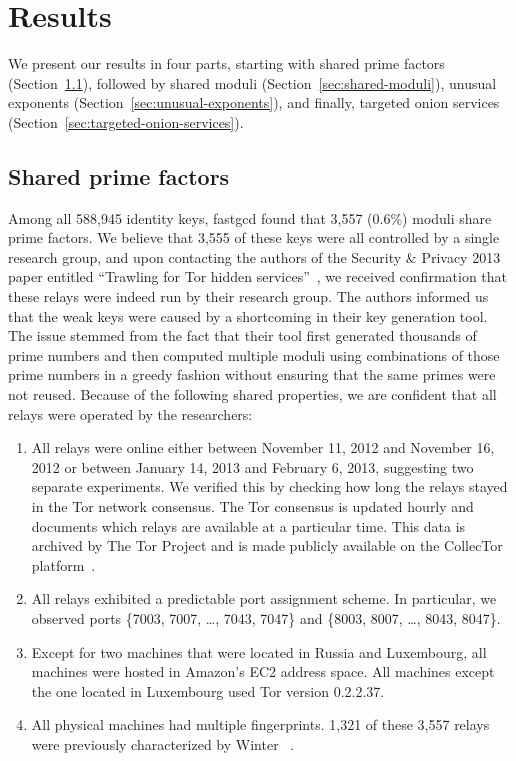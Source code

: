 \section{Results}
\label{sec:results}
We present our results in four parts, starting with shared prime factors
(Section~\ref{sec:shared-primes}), followed by shared moduli
(Section~\ref{sec:shared-moduli}), unusual exponents 
(Section~\ref{sec:unusual-exponents}), and finally, targeted onion services
(Section~\ref{sec:targeted-onion-services}).

\subsection{Shared prime factors}
\label{sec:shared-primes}
Among all 588,945 identity keys, fastgcd found that 3,557 (0.6\%)
moduli share prime factors.  We believe that 3,555 of these keys were all
controlled by a single research group, and upon contacting the authors of the
Security \& Privacy 2013 paper entitled ``Trawling for Tor hidden
services''~\cite{Biryukov2013a}, we received confirmation that these relays
were indeed run by their research group.  The authors informed us that the weak
keys were caused by a shortcoming in their key generation tool. The issue
stemmed from the fact that their tool first generated thousands of prime numbers
and then computed multiple moduli using combinations of those prime numbers in a
greedy fashion without ensuring that the same primes were not reused.  Because
of the following shared properties, we are confident that all relays were
operated by the researchers:

\begin{enumerate}
	\item All relays were online either between November 11, 2012 and
		November 16, 2012 or between January 14, 2013 and February 6, 2013,
		suggesting two separate experiments. We verified this by checking how
		long the relays stayed in the Tor network consensus. The Tor consensus
		is updated hourly and documents which relays are available at a
		particular time. This data is archived by The Tor Project and is made
		publicly available on the CollecTor platform~\cite{collector}.

	\item All relays exhibited a predictable port assignment scheme.  In
		particular, we observed ports \{7003, 7007, \dots, 7043, 7047\} and
		\{8003, 8007, \dots, 8043, 8047\}.

	\item Except for two machines that were located in Russia and Luxembourg,
		all machines were hosted in Amazon's EC2 address space.  All machines
		except the one located in Luxembourg used Tor version 0.2.2.37.

	\item All physical machines had multiple fingerprints.  1,321 of these 3,557
		relays were previously characterized by Winter
		\ea~\cite[\S~5.1]{Winter2016a}.
\end{enumerate}


